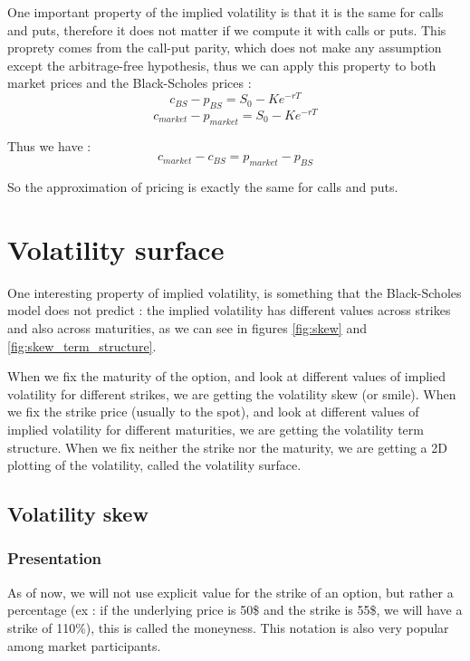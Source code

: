 \documentclass[hidelinks]{article}
\theoremstyle{definition}
\begin{document}
One important property of the implied volatility is that it is the same for calls and puts, therefore it does not matter if we compute it with calls or puts. This proprety comes from the call-put parity, which does not make any assumption except the arbitrage-free hypothesis, thus we can apply this property to both market prices and the Black-Scholes prices :
$$ c_{BS} - p_{BS} = S_0 - K e^{-rT}$$
$$c_{market} - p_{market} = S_0 - K e^{-rT}$$

Thus we have :
$$c_{market} - c_{BS} = p_{market} - p_{BS}$$

So the approximation of pricing is exactly the same for calls and puts.

\newpage
\section{Volatility surface}
One interesting property of implied volatility, is something that the Black-Scholes model does not predict : the implied volatility has different values across strikes and also across maturities, as we can see in figures \ref{fig:skew} and \ref{fig:skew_term_structure}.

 When we fix the maturity of the option, and look at different values of implied volatility for different strikes, we are getting the volatility skew (or smile). When we fix the strike price (usually to the spot), and look at different values of implied volatility for different maturities, we are getting the volatility term structure. When we fix neither the strike nor the maturity, we are getting a 2D plotting of the volatility, called the volatility surface.
 
\subsection{Volatility skew}

\subsubsection{Presentation}

As of now, we will not use explicit value for the strike of an option, but rather a percentage (ex : if the underlying price is 50\$ and the strike is 55\$, we will have a strike of 110\%), this is called the moneyness. This notation is also very popular among market participants. 
\end{document}
